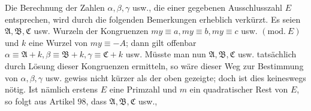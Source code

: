 Die Berechnung der Zahlen \(\alpha,\allowbreak \beta,\allowbreak \gamma\) usw., die einer gegebenen Ausschlusszahl \(E\) entsprechen, wird durch die folgenden Bemerkungen erheblich verkürzt. Es seien \(\mathfrak A,\allowbreak \mathfrak B,\allowbreak \mathfrak C\) usw. Wurzeln der Kongruenzen \(my\equiv a,\allowbreak my\equiv b,\allowbreak my\equiv c\) usw. \((\mathrm{mod.}\ E)\) und \(k\) eine Wurzel von \(my\equiv-A\); dann gilt offenbar \(\alpha\equiv\mathfrak A+k,\allowbreak \beta\equiv\mathfrak B+k,\allowbreak \gamma\equiv\mathfrak C+k\) usw. Müsste man nun \(\mathfrak A,\allowbreak \mathfrak B,\allowbreak \mathfrak C\) usw. tatsächlich durch Lösung dieser Kongruenzen ermitteln, so wäre dieser Weg zur Bestimmung von \(\alpha,\allowbreak \beta,\allowbreak \gamma\) usw. gewiss nicht kürzer als der oben gezeigte; doch ist dies keineswegs nötig. Ist nämlich erstens \(E\) eine Primzahl und \(m\) ein quadratischer Rest von \(E\), so folgt aus Artikel \(98\), dass \(\mathfrak A,\allowbreak \mathfrak B,\allowbreak \mathfrak C\) usw.,
